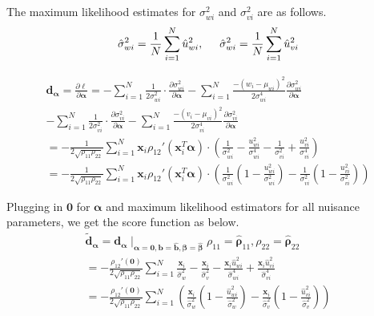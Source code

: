 \documentclass[aoas,preprint]{imsart}
\numberwithin{equation}{section}
\theoremstyle{plain}
\begin{document}
\noindent The maximum likelihood estimates for $\sigma_{wi}^2$ and $\sigma_{vi}^2$ are as follows.
$$\hat{\sigma}_{wi}^2 = \frac{1}{N} \sum_{i=1}^{N} \hat{u}_{wi}^2, \hspace{5mm} 
\hat{\sigma}_{wi}^2 = \frac{1}{N} \sum_{i=1}^{N} \hat{u}_{vi}^2$$

\begin{equation}
    \begin{multlined}
    \bm{d}_{\bm{\alpha}} = \frac{\partial \ell}{\partial \bm{\alpha}} = - \sum_{i=1}^{N} \frac{1}{2\sigma_{wi}^2} \cdot \frac{\partial \sigma_{wi}^2}{\partial \bm{\alpha}} - \sum_{i=1}^{N} \frac{-(w_i - \mu_{wi})^2}{2\sigma_{wi}^4} \frac{\partial \sigma_{wi}^2}{\partial \bm{\alpha}}\\
    - \sum_{i=1}^{N} \frac{1}{2\sigma_{vi}^2} \cdot \frac{\partial \sigma_{vi}^2}{\partial \bm{\alpha}} - \sum_{i=1}^{N} \frac{-(v_i - \mu_{vi})^2}{2\sigma_{vi}^4} \frac{\partial \sigma_{vi}^2}{\partial \bm{\alpha}}\\
    =-\frac{1}{2\sqrt{\rho_{11}\rho_{22}}} \sum_{i=1}^{N} \bm{x}_i \rho_{12}'(\bm{x}_i^T\bm{\alpha}) \cdot \left(
    \frac{1}{\sigma_{wi}^2} - \frac{u_{wi}^2}{\sigma_{wi}^4} 
    - \frac{1}{\sigma_{vi}^2} + \frac{u_{vi}^2}{\sigma_{vi}^4}
    \right)\\
    = -\frac{1}{2\sqrt{\rho_{11}\rho_{22}}} \sum_{i=1}^{N} \bm{x}_i\rho_{12}'(\bm{x}_i^T \bm{\alpha}) \cdot 
    \left(
    \frac{1}{\sigma_{wi}^2} \left( 1 - \frac{u_{wi}^2}{\sigma_{wi}^2}\right) - 
    \frac{1}{\sigma_{vi}^2} \left( 1 - \frac{u_{vi}^2}{\sigma_{vi}^2} \right)
    \right)
    \end{multlined}
\end{equation}

Plugging in $\bm{0}$ for $\bm{\alpha}$ and maximum likelihood estimators for all nuisance parameters, we get the score function as below. 
\begin{equation}
    \begin{multlined}
    \bm{\tilde{d}}_{\bm{\alpha}} = \bm{d}_{\bm{\alpha}}\mid_{\bm{\alpha}=\bm{0}, \bm{b} = \bm{\hat{b}},\bm{\beta} = \bm{\hat{\beta}}}
    {\rho}_{11} = {\bm{\hat{\rho}}_{11}},
    {\rho}_{22} = {\bm{\hat{\rho}}_{22}}\\
    = -\frac{\rho_{12}'(\bm{0})}{2\sqrt{\rho_{11}\rho_{22}}} \sum_{i=1}^{N} \frac{\bm{x}_i}{\hat{\sigma}_{w}^2} - \frac{\bm{x}_i}{\hat{\sigma}_{v}^2} - \frac{\bm{x}_i \hat{u}_{wi}^2}{\hat{\sigma}_{wi}^4} + \frac{\bm{x}_i \hat{u}_{vi}^2}{\hat{\sigma}_{vi}^4}\\
    = -\frac{\rho_{12}'(\bm{0})}{2\sqrt{\rho_{11}\rho_{22}}} \sum_{i=1}^{N} \left(
    \frac{\bm{x}_i}{\hat{\sigma}_{w}^2}
    \left( 1-\frac{\hat{u}_{wi}^2}{\hat{\sigma}_{w}^2}\right) - 
    \frac{\bm{x}_i}{\hat{\sigma}_{v}^2}
    \left( 1-\frac{\hat{u}_{vi}^2}{\hat{\sigma}_{v}^2}\right) 
    \right)
    \end{multlined}
\end{equation}
\end{document}
